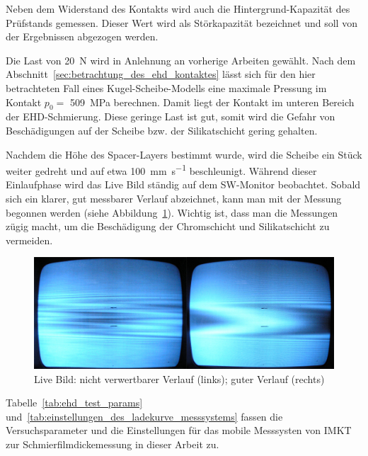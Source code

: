 Neben dem Widerstand des Kontakts wird auch die Hintergrund-Kapazität des Prüfstands gemessen.
Dieser Wert wird als Störkapazität bezeichnet und soll von der Ergebnissen abgezogen werden.

Die Last von \SI{20}{\newton} wird in Anlehnung an vorherige Arbeiten gewählt.
Nach dem Abschnitt~\ref{sec:betrachtung_des_ehd_kontaktes} lässt sich für den hier betrachteten Fall eines Kugel-Scheibe-Modells eine maximale Pressung im Kontakt $p_0 =$ \SI{509}{\mega\pascal} berechnen.
Damit liegt der Kontakt im unteren Bereich der EHD-Schmierung.
Diese geringe Last ist gut, somit wird die Gefahr von Beschädigungen auf der Scheibe bzw. der Silikatschicht gering gehalten.

Nachdem die Höhe des Spacer-Layers bestimmt wurde, wird die Scheibe ein Stück weiter gedreht und auf etwa \SI[per-mode=symbol]{100}{\mm\per\second} beschleunigt.
Während dieser Einlaufphase wird das Live Bild ständig auf dem SW-Monitor beobachtet.
Sobald sich ein klarer, gut messbarer Verlauf abzeichnet, kann man mit der Messung begonnen werden (siehe Abbildung~\ref{fig:ehd_live_bild}).
Wichtig ist, dass man die Messungen zügig macht, um die Beschädigung der Chromschicht und Silikatschicht zu vermeiden.

\begin{figure}[htb]
    \centering
    \includegraphics[width=0.8\linewidth]{./images/ehd_live_bild.jpg}
    \caption{Live Bild: nicht verwertbarer Verlauf (links); guter Verlauf (rechts)~\cite{mach_2008}}
    \label{fig:ehd_live_bild}
\end{figure}

Tabelle~\ref{tab:ehd_test_params} und~\ref{tab:einstellungen_des_ladekurve_messsystems} fassen die Versuchsparameter und die Einstellungen für das mobile Messsysten von IMKT zur Schmierfilmdickemessung in dieser Arbeit zu.





